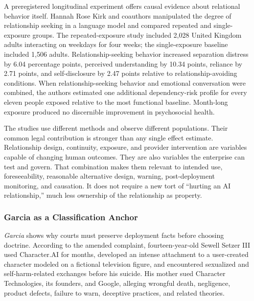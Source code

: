 A preregistered longitudinal experiment offers causal evidence about relational behavior itself. Hannah Rose Kirk and coauthors manipulated the degree of relationship seeking in a language model and compared repeated and single-exposure groups. The repeated-exposure study included 2,028 United Kingdom adults interacting on weekdays for four weeks; the single-exposure baseline included 1,506 adults. Relationship-seeking behavior increased separation distress by 6.04 percentage points, perceived understanding by 10.34 points, reliance by 2.71 points, and self-disclosure by 2.47 points relative to relationship-avoiding conditions. When relationship-seeking behavior and emotional conversation were combined, the authors estimated one additional dependency-risk profile for every eleven people exposed relative to the most functional baseline. Month-long exposure produced no discernible improvement in psychosocial health.

The studies use different methods and observe different populations. Their common legal contribution is stronger than any single effect estimate. Relationship design, continuity, exposure, and provider intervention are variables capable of changing human outcomes. They are also variables the enterprise can test and govern. That combination makes them relevant to intended use, foreseeability, reasonable alternative design, warning, post-deployment monitoring, and causation. It does not require a new tort of ``hurting an AI relationship,'' much less ownership of the relationship as property.

\subsubsection{Garcia as a Classification Anchor}

\emph{Garcia} shows why courts must preserve deployment facts before choosing doctrine. According to the amended complaint, fourteen-year-old Sewell Setzer III used Character.AI for months, developed an intense attachment to a user-created character modeled on a fictional television figure, and encountered sexualized and self-harm-related exchanges before his suicide. His mother sued Character Technologies, its founders, and Google, alleging wrongful death, negligence, product defects, failure to warn, deceptive practices, and related theories.

